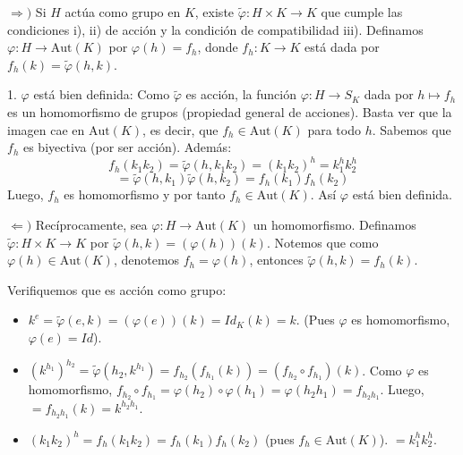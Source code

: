 \begin{enefecto}
    $\Rightarrow)$ Si $H$ actúa como grupo en $K$, existe $\tilde{\varphi}: H \times K \to K$ que cumple las condiciones i), ii) de acción y la condición de compatibilidad iii).
    Definamos $\varphi: H \to \text{Aut}(K)$ por $\varphi(h) = f_h$, donde $f_h: K \to K$ está dada por $f_h(k) = \tilde{\varphi}(h, k)$.
    
    1. $\varphi$ está bien definida:
    Como $\tilde{\varphi}$ es acción, la función $\varphi: H \to S_K$ dada por $h \mapsto f_h$ es un homomorfismo de grupos (propiedad general de acciones).
    Basta ver que la imagen cae en $\text{Aut}(K)$, es decir, que $f_h \in \text{Aut}(K)$ para todo $h$.
    Sabemos que $f_h$ es biyectiva (por ser acción). Además:
    \begin{equation*}
        f_h(k_1 k_2) = \tilde{\varphi}(h, k_1 k_2) = (k_1 k_2)^h = k_1^h k_2^h
    \end{equation*}
    \begin{equation*}
        = \tilde{\varphi}(h, k_1) \tilde{\varphi}(h, k_2) = f_h(k_1) f_h(k_2)
    \end{equation*}
    Luego, $f_h$ es homomorfismo y por tanto $f_h \in \text{Aut}(K)$. Así $\varphi$ está bien definida.
    
    $\Leftarrow)$ Recíprocamente, sea $\varphi: H \to \text{Aut}(K)$ un homomorfismo.
    Definamos $\tilde{\varphi}: H \times K \to K$ por $\tilde{\varphi}(h, k) = (\varphi(h))(k)$.
    Notemos que como $\varphi(h) \in \text{Aut}(K)$, denotemos $f_h = \varphi(h)$, entonces $\tilde{\varphi}(h, k) = f_h(k)$.
    
    Verifiquemos que es acción como grupo:
    \begin{itemize}
        \item $k^e = \tilde{\varphi}(e, k) = (\varphi(e))(k) = Id_K(k) = k$. (Pues $\varphi$ es homomorfismo, $\varphi(e) = Id$).
        \item $(k^{h_1})^{h_2} = \tilde{\varphi}(h_2, k^{h_1}) = f_{h_2}(f_{h_1}(k)) = (f_{h_2} \circ f_{h_1})(k)$.
        Como $\varphi$ es homomorfismo, $f_{h_2} \circ f_{h_1} = \varphi(h_2) \circ \varphi(h_1) = \varphi(h_2 h_1) = f_{h_2 h_1}$.
        Luego, $= f_{h_2 h_1}(k) = k^{h_2 h_1}$.
        \item 
        $(k_1 k_2)^h = f_h(k_1 k_2) = f_h(k_1) f_h(k_2)$ (pues $f_h \in \text{Aut}(K)$).
        $= k_1^h k_2^h$.
    \end{itemize}
\end{enefecto}

